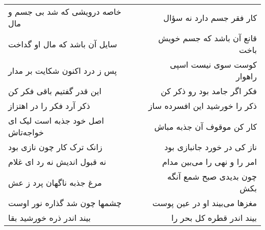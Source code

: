 \begin{center}
\begin{longtable}{l p{0.5cm} r}
خاصه درویشی که شد بی جسم و مال
&&
کار فقر جسم دارد نه سؤال
\\
سایل آن باشد که مال او گداخت
&&
قانع آن باشد که جسم خویش باخت
\\
پس ز درد اکنون شکایت بر مدار
&&
کوست سوی نیست اسپی راهوار
\\
این قدر گفتیم باقی فکر کن
&&
فکر اگر جامد بود رو ذکر کن
\\
ذکر آرد فکر را در اهتزاز
&&
ذکر را خورشید این افسرده ساز
\\
اصل خود جذبه است لیک ای خواجه‌تاش
&&
کار کن موقوف آن جذبه مباش
\\
زانک ترک کار چون نازی بود
&&
ناز کی در خورد جانبازی بود
\\
نه قبول اندیش نه رد ای غلام
&&
امر را و نهی را می‌بین مدام
\\
مرغ جذبه ناگهان پرد ز عش
&&
چون بدیدی صبح شمع آنگه بکش
\\
چشمها چون شد گذاره نور اوست
&&
مغزها می‌بیند او در عین پوست
\\
بیند اندر ذره خورشید بقا
&&
بیند اندر قطره کل بحر را
\\
\end{longtable}
\end{center}
